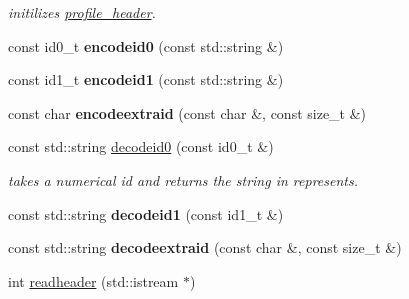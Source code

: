 \begin{DoxyCompactItemize}
\begin{DoxyCompactList}\small\item\em initilizes \hyperlink{classprofile__header}{profile\-\_\-header}. \end{DoxyCompactList}\item 
\hypertarget{classprofile__header_a69b5722d0beef5743db03987b3897ffc}{const id0\-\_\-t {\bfseries encodeid0} (const std\-::string \&)}\label{classprofile__header_a69b5722d0beef5743db03987b3897ffc}

\item 
\hypertarget{classprofile__header_a2877c737575eaa8c5e334b65b93afb2f}{const id1\-\_\-t {\bfseries encodeid1} (const std\-::string \&)}\label{classprofile__header_a2877c737575eaa8c5e334b65b93afb2f}

\item 
\hypertarget{classprofile__header_ad05e280cff34022e836a9fc98d67599e}{const char {\bfseries encodeextraid} (const char \&, const size\-\_\-t \&)}\label{classprofile__header_ad05e280cff34022e836a9fc98d67599e}

\item 
\hypertarget{classprofile__header_a055f1012cdb9dd67480675e87c9f70cc}{const std\-::string \hyperlink{classprofile__header_a055f1012cdb9dd67480675e87c9f70cc}{decodeid0} (const id0\-\_\-t \&)}\label{classprofile__header_a055f1012cdb9dd67480675e87c9f70cc}

\begin{DoxyCompactList}\small\item\em takes a numerical id and returns the string in represents. \end{DoxyCompactList}\item 
\hypertarget{classprofile__header_a74524b84484905995dae36144172b2b6}{const std\-::string {\bfseries decodeid1} (const id1\-\_\-t \&)}\label{classprofile__header_a74524b84484905995dae36144172b2b6}

\item 
\hypertarget{classprofile__header_a0821d968d6172b479947e759b09ce3fd}{const std\-::string {\bfseries decodeextraid} (const char \&, const size\-\_\-t \&)}\label{classprofile__header_a0821d968d6172b479947e759b09ce3fd}

\item 
\hypertarget{classprofile__header_ad9bd955be08aba0c07bad05c03a9fe7b}{int \hyperlink{classprofile__header_ad9bd955be08aba0c07bad05c03a9fe7b}{readheader} (std\-::istream $\ast$)}\label{classprofile__header_ad9bd955be08aba0c07bad05c03a9fe7b}


\end{DoxyCompactItemize}
